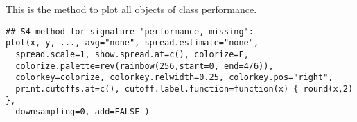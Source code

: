 \begin{Description}\relax
This is the method to plot all objects of class
performance.
\end{Description}
\begin{Usage}
\begin{verbatim}
## S4 method for signature 'performance, missing':
plot(x, y, ..., avg="none", spread.estimate="none",
  spread.scale=1, show.spread.at=c(), colorize=F,
  colorize.palette=rev(rainbow(256,start=0, end=4/6)),
  colorkey=colorize, colorkey.relwidth=0.25, colorkey.pos="right",
  print.cutoffs.at=c(), cutoff.label.function=function(x) { round(x,2) },
  downsampling=0, add=FALSE )
\end{verbatim}
\end{Usage}
